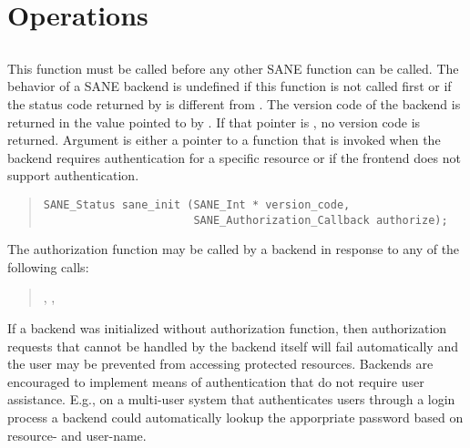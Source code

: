 \documentclass[11pt,DVIps]{report}
\begin{document}
\section{Operations}

\subsection{}

This function must be called before any other SANE function can be called.
The behavior of a SANE backend is undefined if this function is not called
first or if the status code returned by  is different from
.  The version code of the backend is returned
in the value pointed to by .  If that pointer is
, no version code is returned.  Argument  is either
a pointer to a function that is invoked when the backend requires
authentication for a specific resource or  if the frontend does not
support authentication.
\begin{quote}
\begin{verbatim}
SANE_Status sane_init (SANE_Int * version_code,
                       SANE_Authorization_Callback authorize);
\end{verbatim}
\end{quote}

The authorization function may be called by a backend in response to
any of the following calls:
\begin{quote}
  , , 
\end{quote}
If a backend was initialized without authorization function, then
authorization requests that cannot be handled by the backend itself
will fail automatically and the user may be prevented from accessing
protected resources.  Backends are encouraged to implement means of
authentication that do not require user assistance.  E.g., on a
multi-user system that authenticates users through a login process a
backend could automatically lookup the apporpriate password based on
resource- and user-name.
\end{document}
